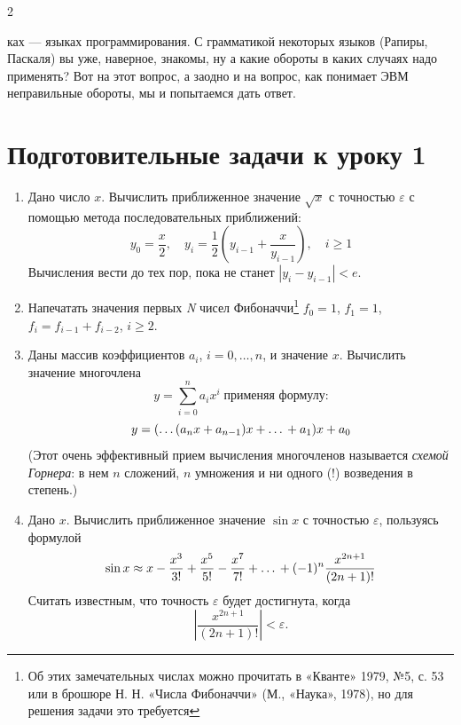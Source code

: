 \documentclass[14pt, a4paper]{article}
\begin{document}
\begin{multicols}{2} %

\noindent ках — языках программирования. С грамматикой некоторых языков (Рапиры, Паскаля) вы уже, наверное, знакомы, ну а какие обороты в каких случаях надо применять? Вот на этот вопрос, а заодно и на вопрос, как понимает ЭВМ неправильные обороты, мы и попытаемся дать ответ.

\section*{\normalsize Подготовительные задачи к уроку 1}

\begin{enumerate}[label=\bfseries\arabic*., wide=0pt,itemindent = 2em]
\item Дано число $x$. Вычислить приближенное значение $\sqrt{x}$ с точностью $\varepsilon$ с помощью метода последовательных приближений:
\[
y_0 = \frac{x}{2}, \quad y_i = \frac{1}{2} \left( y_{i-1} + \frac{x}{y_{i-1}} \right), \quad i \ge 1
\]
Вычисления вести до тех пор, пока не станет \linebreak$|y_i - y_{i-1}| < e$.

\item Напечатать значения первых \textit{N} чисел Фибоначчи\footnote[1]{Об этих замечательных числах можно прочитать в «Кванте» 1979, №5, с. 53 или в брошюре Н. Н.  «Числа Фибоначчи» (М., «Наука», 1978), но для решения задачи это требуется}\linebreak  
$f_0 = 1$, $f_1 = 1$, $f_i = f_{i-1} + f_{i-2}$, $i \ge 2$.

\item Даны массив коэффициентов $a_i$, $i = 0, \dots, n$, и значение $x$. Вычислить значение многочлена
\[
y = \sum_{i=0}^{n} a_i x^i  \;\text{применяя формулу:}
\]
\[
y = (\dots(a_n x + a_{n-1})x + \dots\vphantom  ++ a_1)x + a_0
\]
(Этот очень эффективный прием вычисления многочленов называется \textit{схемой Горнера}: в нем $n$ сложений, $n$ умножения и ни одного (!) возведения в степень.)

\item Дано $x$. Вычислить приближенное значение $\sin x$ с точностью $\varepsilon$, пользуясь формулой  
\[
\sin x \approx x - \frac{x^3}{3!} + \frac{x^5}{5!} - \frac{x^7}{7!} + \dots\vphantom  ++ (-1)^n \frac{x^{2n+1}}{(2n+1)!}
\]
Считать известным, что точность $\varepsilon$ будет достигнута, когда  
\[
\left| \frac{x^{2n+1}}{(2n+1)!} \right| < \varepsilon.
\]


\end{enumerate}
\end{multicols}
\end{document}
